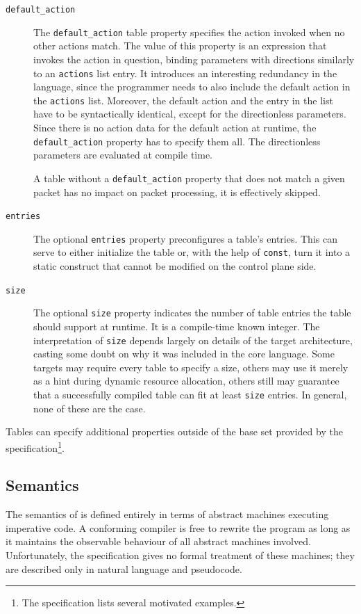 \begin{description}
\item[\texttt{default\_action}] The \texttt{default\_action} table property
specifies the action invoked when no other actions match. The value of this
property is an expression that invokes the action in question, binding
parameters with directions similarly to an \texttt{actions} list entry. It
introduces an interesting redundancy in the \pfs language, since the programmer
needs to also include the default action in the \texttt{actions} list. Moreover,
the default action and the entry in the list have to be syntactically identical,
except for the directionless parameters. Since there is no action data for the
default action at runtime, the \texttt{default\_action} property has to specify
them all. The directionless parameters are evaluated at compile time.

A table without a \texttt{default\_action} property that does not match a given
packet has no impact on packet processing, it is effectively skipped.

\item[\texttt{entries}] The optional \texttt{entries} property preconfigures a
table's entries. This can serve to either initialize the table or, with the help
of \texttt{const}, turn it into a static construct that cannot be modified on
the control plane side.

\item[\texttt{size}] The optional \texttt{size} property indicates the number of
table entries the table should support at runtime. It is a compile-time known
integer. The interpretation of \texttt{size} depends largely on details of the
target architecture, casting some doubt on why it was included in the core
language. Some targets may require every table to specify a size, others may use
it merely as a hint during dynamic resource allocation, others still may
guarantee that a successfully compiled table can fit at least \texttt{size}
entries. In general, none of these are the case.

\end{description}

Tables can specify additional properties outside of the base set provided by the
\pfs specification\footnote{The specification lists several motivated
examples.}.

\subsection{Semantics}

The semantics of \pfs is defined entirely in terms of abstract machines
executing imperative code. A conforming compiler is free to rewrite the \pfs
program as long as it maintains the observable behaviour of all abstract
machines involved. Unfortunately, the specification gives no formal treatment
of these machines; they are described only in natural language and pseudocode.


